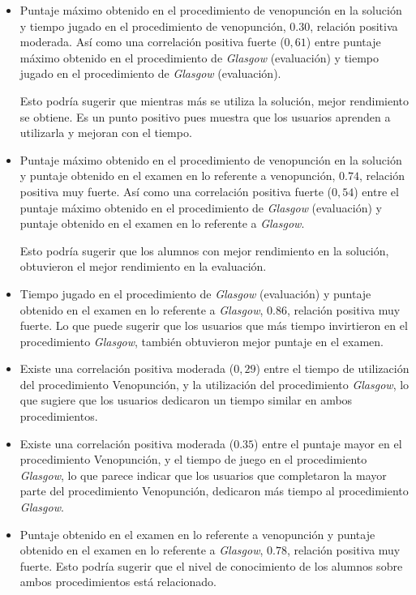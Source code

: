 \begin{itemize}

\item Puntaje máximo obtenido en el procedimiento de venopunción en la solución
    y tiempo  jugado en el procedimiento de venopunción, $0.30$, relación
    positiva moderada. Así como una correlación positiva fuerte ($0,61$) entre
    puntaje máximo obtenido en el procedimiento de \textit{Glasgow} (evaluación)
    y tiempo jugado en el procedimiento de \textit{Glasgow} (evaluación).
    
    Esto podría sugerir que mientras más se utiliza la solución, mejor
    rendimiento se obtiene. Es un punto positivo pues muestra que los usuarios
    aprenden a utilizarla y mejoran con el tiempo.

\item Puntaje máximo obtenido en el procedimiento de venopunción en la solución
    y puntaje obtenido en el examen en lo referente a venopunción, $0.74$,
    relación positiva muy fuerte. Así como una correlación positiva fuerte
    ($0,54$) entre el puntaje máximo obtenido en el procedimiento de
    \textit{Glasgow} (evaluación) y puntaje obtenido en el examen en lo
    referente a \textit{Glasgow}.
    
    Esto podría sugerir que los alumnos con mejor rendimiento en la solución,
    obtuvieron el mejor rendimiento en la evaluación.

\item Tiempo jugado en el procedimiento de \textit{Glasgow} (evaluación) y
    puntaje obtenido en el examen en lo referente a \textit{Glasgow}, $0.86$,
    relación positiva muy fuerte. Lo que puede sugerir que los usuarios que más
    tiempo invirtieron en el procedimiento \textit{Glasgow}, también obtuvieron
    mejor puntaje en el examen.

\item Existe una correlación positiva moderada ($0,29$) entre el tiempo de
    utilización del procedimiento Venopunción, y la utilización del
    procedimiento \textit{Glasgow}, lo que sugiere que los usuarios dedicaron un
    tiempo similar en ambos procedimientos.

\item Existe una correlación positiva moderada ($0.35$) entre el puntaje mayor
    en el procedimiento Venopunción, y el tiempo de juego en el procedimiento
    \textit{Glasgow}, lo que parece indicar que los usuarios que completaron la
    mayor parte del procedimiento Venopunción, dedicaron más tiempo al
    procedimiento \textit{Glasgow}. 

\item Puntaje obtenido en el examen en lo referente a venopunción y puntaje
    obtenido en el examen en lo referente a \textit{Glasgow}, $0.78$, relación
    positiva muy fuerte. Esto podría sugerir que el nivel de conocimiento de los
    alumnos sobre ambos procedimientos está relacionado.

\end{itemize}

